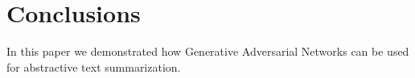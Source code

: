 \documentclass[sigplan]{acmart}
\begin{document}
\section*{Conclusions}

In this paper we demonstrated how Generative Adversarial Networks can be used for abstractive text summarization.





\end{document}
